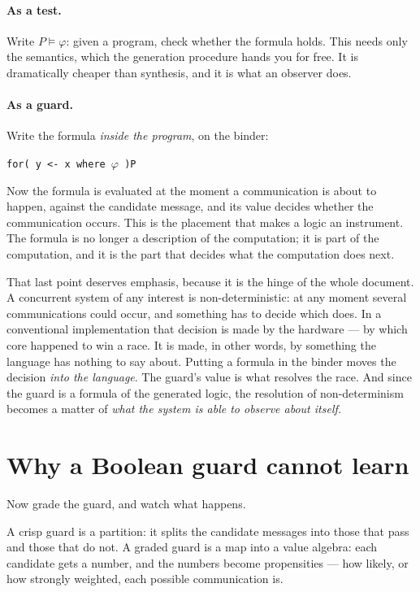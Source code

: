 \paragraph{As a test.} Write $P \models \varphi$: given a program, check whether
the formula holds. This needs only the semantics, which the generation procedure
hands you for free. It is dramatically cheaper than synthesis, and it is what an
observer does.

\paragraph{As a guard.} Write the formula \emph{inside the program}, on the
binder:
\begin{center}
\texttt{for( y <- x where }$\varphi$\texttt{ )P}
\end{center}
Now the formula is evaluated at the moment a communication is about to happen,
against the candidate message, and its value decides whether the communication
occurs. This is the placement that makes a logic an instrument. The formula is no
longer a description of the computation; it is part of the computation, and it is
the part that decides what the computation does next.

That last point deserves emphasis, because it is the hinge of the whole document.
A concurrent system of any interest is non-deterministic: at any moment several
communications could occur, and something has to decide which does. In a
conventional implementation that decision is made by the hardware --- by which
core happened to win a race. It is made, in other words, by something the language
has nothing to say about. Putting a formula in the binder moves the decision
\emph{into the language}. The guard's value is what resolves the race. And since
the guard is a formula of the generated logic, the resolution of non-determinism
becomes a matter of \emph{what the system is able to observe about itself.}

\section{Why a Boolean guard cannot learn}
\label{sec:0boolean}

Now grade the guard, and watch what happens.

A crisp guard is a partition: it splits the candidate messages into those that
pass and those that do not. A graded guard is a map into a value algebra: each
candidate gets a number, and the numbers become propensities --- how likely, or
how strongly weighted, each possible communication is.

